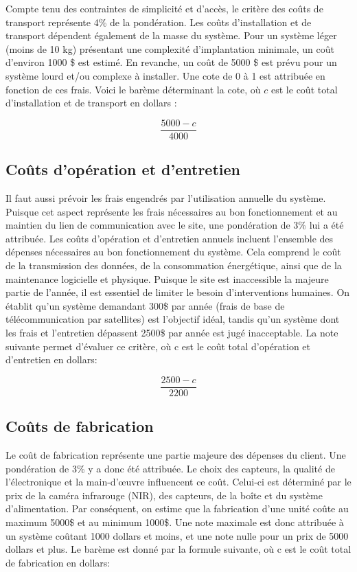 \bigskip
Compte tenu des contraintes de simplicité et d'accès, le critère des coûts de transport représente 4\% de la pondération. Les coûts d’installation et de transport dépendent également de la masse du système. Pour un système léger (moins de 10 kg) présentant une complexité d’implantation minimale, un coût d’environ 1000 \$ est estimé. En revanche, un coût de 5000 \$ est prévu pour un système lourd et/ou complexe à installer. Une cote de 0 à 1 est attribuée en fonction de ces frais. Voici le barème déterminant la cote, où $c$ est le coût total d’installation et de transport en dollars :

\begin{equation}
    \frac{5000 - c}{4000}
\end{equation}

\subsection{Coûts d'opération et d’entretien}
\label{couts_entretien}
Il faut aussi prévoir les frais engendrés par l’utilisation annuelle du système. Puisque cet aspect représente les frais nécessaires au bon fonctionnement et au maintien du lien de communication avec le site, une pondération de 3\% lui a été attribuée. Les coûts d’opération et d’entretien annuels incluent l'ensemble des dépenses nécessaires au bon fonctionnement du système. Cela comprend le coût de la transmission des données, de la consommation énergétique, ainsi que de la maintenance logicielle et physique. Puisque le site est inaccessible la majeure partie de l'année, il est essentiel de limiter le besoin d'interventions humaines. On établit qu'un système demandant 300\$ par année (frais de base de télécommunication par satellites) est l'objectif idéal, tandis qu'un système dont les frais et l'entretien dépassent 2500\$ par année est jugé inacceptable. La note suivante permet d'évaluer ce critère, où c est le coût total d'opération et d'entretien en dollars:

\begin{equation}
    \frac{2500-c}{2200}
\end{equation}

\subsection{Coûts de fabrication}
\label{couts_fabrication}
Le coût de fabrication représente une partie majeure des dépenses du client. Une pondération de 3\% y a donc été attribuée. Le choix des capteurs, la qualité de l'électronique et la main-d’œuvre influencent ce coût. Celui-ci est déterminé par le prix de la caméra infrarouge (NIR), des capteurs, de la boîte et du système d’alimentation.
Par conséquent, on estime que la fabrication d'une unité coûte au maximum 5000\$ et au minimum 1000\$. Une note maximale est donc attribuée à un système coûtant 1000 dollars et moins, et une note nulle pour un prix de 5000 dollars et plus. Le barème est donné par la formule suivante, où c est le coût total de fabrication en dollars:

